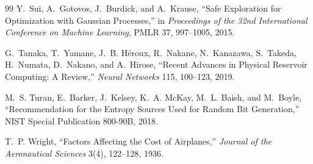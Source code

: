 \documentclass[11pt,openany]{book}
\theoremstyle{plain}
\theoremstyle{definition}
\theoremstyle{remark}
\begin{document}
\begin{thebibliography}{99}
Y.~Sui, A.~Gotovos, J.~Burdick, and A.~Krause,
``Safe Exploration for Optimization with Gaussian Processes,''
in \emph{Proceedings of the 32nd International Conference on Machine Learning}, PMLR 37, 997--1005, 2015.

G.~Tanaka, T.~Yamane, J.~B. H\'eroux, R.~Nakane, N.~Kanazawa, S.~Takeda, H.~Numata, D.~Nakano, and A.~Hirose,
``Recent Advances in Physical Reservoir Computing: A Review,''
\emph{Neural Networks} 115, 100--123, 2019.

M.~S. Turan, E.~Barker, J.~Kelsey, K.~A. McKay, M.~L. Baish, and M.~Boyle,
``Recommendation for the Entropy Sources Used for Random Bit Generation,''
NIST Special Publication 800-90B, 2018.

T.~P. Wright,
``Factors Affecting the Cost of Airplanes,''
\emph{Journal of the Aeronautical Sciences} 3(4), 122--128, 1936.

\end{thebibliography}
\end{document}
